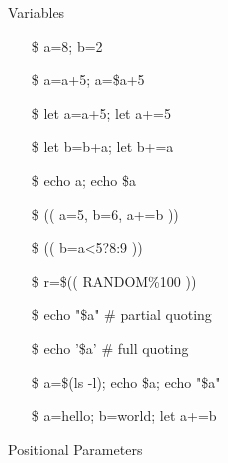 \begin{frame}{Variables}\ttfamily\small
  \begin{itemize}
  \item[\$] a=8; b=2
  \item[\$] a=a+5; a=\$a+5 \Bad
  \item[\$] let a=a+5; let a+=5 \Good
  \item[\$] let b=b+a; let b+=a \Good
  \item[\$] echo a; echo \$a
  \item[\$] (( a=5, b=6, a+=b )) \Good
  \item[\$] (( b=a<5?8:9 )) \Good
  \item[\$] r=\$(( RANDOM\%100 )) \Good
  \item[\$] echo "\$a" \# partial quoting
  \item[\$] echo '\$a' \# full quoting
  \item[\$] a=\$(ls -l); echo \$a; echo "\$a"
  \item[\$] a=hello; b=world; let a+=b \Bad
  \end{itemize}
\end{frame}

\begin{frame}{Positional Parameters}{}
  \begin{minipage}{.44\linewidth}
    \begin{center}
    \end{center}
  \end{minipage}\quad
  \begin{minipage}{.52\linewidth}
    \begin{center}
    \end{center}
  \end{minipage}
\end{frame}

